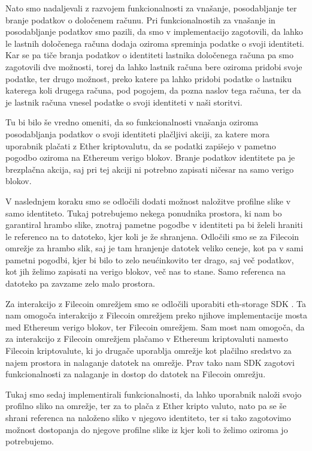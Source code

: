 \documentclass[a4paper,12pt,openright]{book}
\begin{document}
Nato smo nadaljevali z razvojem funkcionalnosti za vnašanje, posodabljanje ter branje podatkov o določenem računu.
Pri funkcionalnostih za vnašanje in posodabljanje podatkov smo pazili, da smo v implementacijo zagotovili, da lahko le lastnih določenega računa dodaja oziroma spreminja podatke o svoji identiteti.
Kar se pa tiče branja podatkov o identiteti lastnika določenega računa pa smo zagotovili dve možnosti, torej da lahko lastnik računa bere oziroma pridobi svoje podatke, ter drugo možnost, preko katere pa lahko pridobi podatke o lastniku katerega koli drugega računa, pod pogojem, da pozna naslov tega računa, ter da je lastnik računa vnesel podatke o svoji identiteti v naši storitvi.

Tu bi bilo še vredno omeniti, da so funkcionalnosti vnašanja oziroma posodabljanja podatkov o svoji identiteti plačljivi akciji, za katere mora uporabnik plačati z Ether kriptovalutu, da se podatki zapišejo v pametno pogodbo oziroma na Ethereum verigo blokov.
Branje podatkov identitete pa je brezplačna akcija, saj pri tej akciji ni potrebno zapisati ničesar na samo verigo blokov.


V naslednjem koraku smo se odločili dodati možnost naložitve profilne slike v samo identiteto.
Tukaj potrebujemo nekega ponudnika prostora, ki nam bo garantiral hrambo slike, znotraj pametne pogodbe v identiteti pa bi želeli hraniti le referenco na to datoteko, kjer koli je že shranjena.
Odločili smo se za Filecoin omrežje za hrambo slik, saj je tam hranjenje datotek veliko ceneje, kot pa v sami pametni pogodbi, kjer bi bilo to zelo neućinkovito ter drago, saj več podatkov, kot jih želimo zapisati na verigo blokov, več nas to stane.
Samo referenca na datoteko pa zavzame zelo malo prostora.

Za interakcijo z Filecoin omrežjem smo se odločili uporabiti eth-storage SDK \cite{textile_storage_gh}.
Ta nam omogoča interakcijo z Filecoin omrežjem preko njihove implementacije mosta med Ethereum verigo blokov, ter Filecoin omrežjem.
Sam most nam omogoča, da za interakcijo z Filecoin omrežjem plačamo v Ethereum kriptovaluti namesto Filecoin kriptovalute, ki jo drugače uporablja omrežje kot plačilno sredstvo za najem prostora in nalaganje datotek na omrežje.
Prav tako nam SDK zagotovi funkcionalnosti za nalaganje in dostop do datotek na Filecoin omrežju.

Tukaj smo sedaj implementirali funkcionalnosti, da lahko uporabnik naloži svojo profilno sliko na omrežje, ter za to plača z Ether kripto valuto, nato pa se še shrani referenca na naloženo sliko v njegovo identiteto, ter si tako zagotovimo možnost dostopanja do njegove profilne slike iz kjer koli to želimo oziroma jo potrebujemo. 
\end{document}
